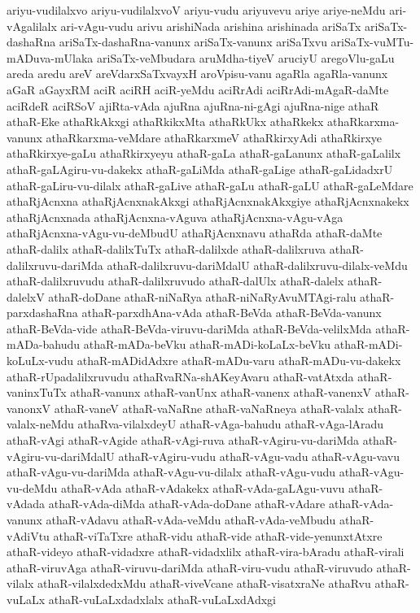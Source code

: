 {ariyu-vudilalxvo
ariyu-vudilalxvoV
ariyu-vudu
ariyuvevu
ariye
ariye-neMdu
ari-vAgalilalx
ari-vAgu-vudu
arivu
arishiNada
arishina
arishinada
ariSaTx
ariSaTx-dashaRna
ariSaTx-dashaRna-vanunx
ariSaTx-vanunx
ariSaTxvu
ariSaTx-vuMTu-mADuva-mUlaka
ariSaTx-veMbudara
aruMdha-tiyeV
aruciyU
aregoVlu-gaLu
areda
aredu
areV
areVdarxSaTxvayxH
aroVpisu-vanu
agaRla
agaRla-vanunx
aGaR
aGayxRM
aciR
aciRH
aciR-yeMdu
aciRrAdi
aciRrAdi-mAgaR-daMte
aciRdeR
aciRSoV
ajiRta-vAda
ajuRna
ajuRna-ni-gAgi
ajuRna-nige
athaR
athaR-Eke
athaRkAkxgi
athaRkikxMta
athaRkUkx
athaRkekx
athaRkarxma-vanunx
athaRkarxma-veMdare
athaRkarxmeV
athaRkirxyAdi
athaRkirxye
athaRkirxye-gaLu
athaRkirxyeyu
athaR-gaLa
athaR-gaLanunx
athaR-gaLalilx
athaR-gaLAgiru-vu-dakekx
athaR-gaLiMda
athaR-gaLige
athaR-gaLidadxrU
athaR-gaLiru-vu-dilalx
athaR-gaLive
athaR-gaLu
athaR-gaLU
athaR-gaLeMdare
athaRjAcnxna
athaRjAcnxnakAkxgi
athaRjAcnxnakAkxgiye
athaRjAcnxnakekx
athaRjAcnxnada
athaRjAcnxna-vAguva
athaRjAcnxna-vAgu-vAga
athaRjAcnxna-vAgu-vu-deMbudU
athaRjAcnxnavu
athaRda
athaR-daMte
athaR-dalilx
athaR-dalilxTuTx
athaR-dalilxde
athaR-dalilxruva
athaR-dalilxruvu-dariMda
athaR-dalilxruvu-dariMdalU
athaR-dalilxruvu-dilalx-veMdu
athaR-dalilxruvudu
athaR-dalilxruvudo
athaR-dalUlx
athaR-dalelx
athaR-dalelxV
athaR-doDane
athaR-niNaRya
athaR-niNaRyAvuMTAgi-ralu
athaR-parxdashaRna
athaR-parxdhAna-vAda
athaR-BeVda
athaR-BeVda-vanunx
athaR-BeVda-vide
athaR-BeVda-viruvu-dariMda
athaR-BeVda-velilxMda
athaR-mADa-bahudu
athaR-mADa-beVku
athaR-mADi-koLaLx-beVku
athaR-mADi-koLuLx-vudu
athaR-mADidAdxre
athaR-mADu-varu
athaR-mADu-vu-dakekx
athaR-rUpadalilxruvudu
athaRvaRNa-shAKeyAvaru
athaR-vatAtxda
athaR-vaninxTuTx
athaR-vanunx
athaR-vanUnx
athaR-vanenx
athaR-vanenxV
athaR-vanonxV
athaR-vaneV
athaR-vaNaRne
athaR-vaNaRneya
athaR-valalx
athaR-valalx-neMdu
athaRva-vilalxdeyU
athaR-vAga-bahudu
athaR-vAga-lAradu
athaR-vAgi
athaR-vAgide
athaR-vAgi-ruva
athaR-vAgiru-vu-dariMda
athaR-vAgiru-vu-dariMdalU
athaR-vAgiru-vudu
athaR-vAgu-vadu
athaR-vAgu-vavu
athaR-vAgu-vu-dariMda
athaR-vAgu-vu-dilalx
athaR-vAgu-vudu
athaR-vAgu-vu-deMdu
athaR-vAda
athaR-vAdakekx
athaR-vAda-gaLAgu-vuvu
athaR-vAdada
athaR-vAda-diMda
athaR-vAda-doDane
athaR-vAdare
athaR-vAda-vanunx
athaR-vAdavu
athaR-vAda-veMdu
athaR-vAda-veMbudu
athaR-vAdiVtu
athaR-viTaTxre
athaR-vidu
athaR-vide
athaR-vide-yenunxtAtxre
athaR-videyo
athaR-vidadxre
athaR-vidadxlilx
athaR-vira-bAradu
athaR-virali
athaR-viruvAga
athaR-viruvu-dariMda
athaR-viru-vudu
athaR-viruvudo
athaR-vilalx
athaR-vilalxdedxMdu
athaR-viveVcane
athaR-visatxraNe
athaRvu
athaR-vuLaLx
athaR-vuLaLxdadxlalx
athaR-vuLaLxdAdxgi
}
